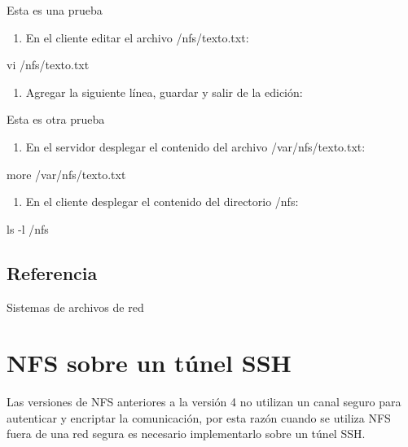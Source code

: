 \begin{SourceCode}
Esta es una prueba
\end{SourceCode}

\begin{enumerate}
\item En el cliente editar el archivo /nfs/texto.txt:
\end{enumerate}

\begin{SourceCode}
vi /nfs/texto.txt
\end{SourceCode}

\begin{enumerate}
\item Agregar la siguiente línea, guardar y salir de la edición:
\end{enumerate}

\begin{SourceCode}
Esta es otra prueba
\end{SourceCode}

\begin{enumerate}
\item En el servidor desplegar el contenido del archivo /var/nfs/texto.txt:
\end{enumerate}

\begin{SourceCode}
more /var/nfs/texto.txt
\end{SourceCode}

\begin{enumerate}
\item En el cliente desplegar el contenido del directorio /nfs:
\end{enumerate}

\begin{SourceCode}
ls -l /nfs
\end{SourceCode}

\section{Referencia}

Sistemas de archivos de red

\chapter{NFS sobre un túnel SSH}

Las versiones de NFS anteriores a la versión 4 no utilizan un canal seguro para autenticar y encriptar la comunicación, por esta razón cuando se utiliza NFS fuera de una red segura es necesario implementarlo sobre un túnel SSH.

